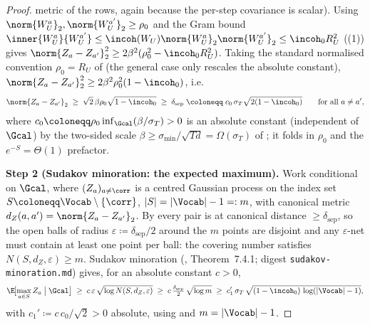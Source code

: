 \begin{proof}
metric of the rows, again because the per-step covariance is scalar). Using
$\norm{W_U^a}_2,\norm{W_U^{a'}}_2\ge\rho_0$ and the Gram bound
$\inner{W_U^a}{W_U^{a'}}\le\incoh(W_U)\norm{W_U^a}_2\norm{W_U^{a'}}_2\le\incoh_0 R_U^2$
((1)) gives
$\norm{Z_a-Z_{a'}}_2^2\ge2\beta^2(\rho_0^2-\incoh_0 R_U^2)$. Taking the
standard normalised convention $\rho_0=R_U$ of
 (the general case only rescales the
absolute constant), $\norm{Z_a-Z_{a'}}_2^2\ge2\beta^2\rho_0^2(1-\incoh_0)$,
i.e.
\begin{align}\label{eq:antic_delta_def}
   \norm{Z_a-Z_{a'}}_2
   \;\ge\; \sqrt2\,\beta\rho_0\sqrt{1-\incoh_0}
   \;\ge\; \delta_{\mathrm{sep}}
   \;\coloneqq\; c_0\,\sigma_T\sqrt{2(1-\incoh_0)}
   \qquad\text{for all }a\neq a',
\end{align}
where $c_0\coloneqq\rho_0\inf_{\Gcal}(\beta/\sigma_T)>0$ is an absolute
constant (independent of $\Gcal$) by the two-sided scale
$\beta\ge\sigma_{\min}/\sqrt{Td}=\Omega(\sigma_T)$ of ;
it folds in $\rho_0$ and the $e^{-S}=\Theta(1)$ prefactor.

\smallskip\noindent\textbf{Step 2 (Sudakov minoration: the expected
maximum).} Work conditional on $\Gcal$, where $(Z_a)_{a\neq\corr}$ is a
centred Gaussian process on the index set $S\coloneqq\Vocab\setminus\{\corr\}$,
$|S|=|\Vocab|-1=:m$, with canonical metric $d_Z(a,a')=\norm{Z_a-Z_{a'}}_2$.
By  every pair is at canonical distance
$\ge\delta_{\mathrm{sep}}$, so the open balls of radius
$\varepsilon\coloneqq\delta_{\mathrm{sep}}/2$ around the $m$ points are
disjoint and any $\varepsilon$-net must contain at least one point per
ball: the covering number satisfies $N(S,d_Z,\varepsilon)\ge m$. Sudakov
minoration (\cite{vershynin2018}, Theorem~7.4.1; digest
\texttt{sudakov-minoration.md}) gives, for an absolute constant $c>0$,
\begin{align}\label{eq:antic_sudakov}
   \E\!\bigl[\max_{a\in S}Z_a \;\big|\; \Gcal\bigr]
   \;\ge\; c\,\varepsilon\,\sqrt{\log N(S,d_Z,\varepsilon)}
   \;\ge\; c\,\tfrac{\delta_{\mathrm{sep}}}{2}\,\sqrt{\log m}
   \;\ge\; c_1'\,\sigma_T\,\sqrt{(1-\incoh_0)\,\log(|\Vocab|-1)},
\end{align}
with $c_1'\coloneqq c\,c_0/\sqrt2>0$ absolute, using 
and $m=|\Vocab|-1$.


\end{proof}
